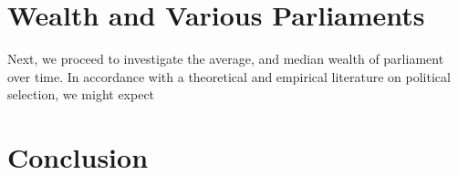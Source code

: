 \section{Wealth and Various Parliaments}
Next, we proceed to investigate the average, and median wealth of parliament over time. In accordance with a theoretical and empirical literature on political selection, we might expect 

\section{Conclusion}


%
%
\printbibliography


